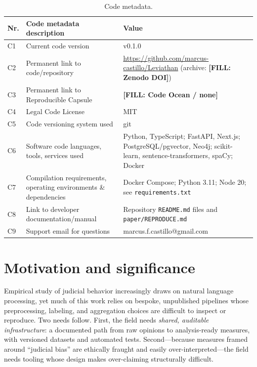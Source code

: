 \documentclass[preprint,12pt]{elsarticle}
\newcommand{\FILL}[1]{{\color{red}\textbf{[FILL: #1]}}}
\begin{document}
\begin{table}[h!]
\centering
\small
\begin{tabular}{|p{}|p{}|p{}|}
\hline
\textbf{Nr.} & \textbf{Code metadata description} & \textbf{Value} \\ \hline
C1 & Current code version & v0.1.0 \\ \hline
C2 & Permanent link to code/repository & \url{https://github.com/marcus-castillo/Leviathan} (archive: \FILL{Zenodo DOI}) \\ \hline
C3 & Permanent link to Reproducible Capsule & \FILL{Code Ocean / none} \\ \hline
C4 & Legal Code License & MIT \\ \hline
C5 & Code versioning system used & git \\ \hline
C6 & Software code languages, tools, services used & Python, TypeScript; FastAPI, Next.js; PostgreSQL/pgvector, Neo4j; scikit-learn, sentence-transformers, spaCy; Docker \\ \hline
C7 & Compilation requirements, operating environments \& dependencies & Docker Compose; Python 3.11; Node 20; see \texttt{requirements.txt} \\ \hline
C8 & Link to developer documentation/manual & Repository \texttt{README.md} files and \texttt{paper/REPRODUCE.md} \\ \hline
C9 & Support email for questions & marcus.f.castillo@gmail.com \\ \hline
\end{tabular}
\caption{Code metadata.}
\end{table}

\section{Motivation and significance}
Empirical study of judicial behavior increasingly draws on natural language processing, yet much of
this work relies on bespoke, unpublished pipelines whose preprocessing, labeling, and aggregation
choices are difficult to inspect or reproduce. Two needs follow. First, the field needs
\emph{shared, auditable infrastructure}: a documented path from raw opinions to analysis-ready
measures, with versioned datasets and automated tests. Second---because measures framed around
``judicial bias'' are ethically fraught and easily over-interpreted---the field needs tooling whose
design makes over-claiming structurally difficult.
\end{document}
